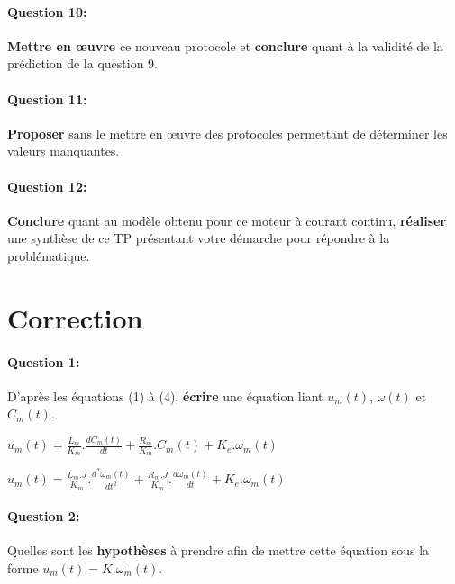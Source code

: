 
\paragraph{Question 10:} \textbf{Mettre en \oe uvre} ce nouveau protocole et \textbf{conclure} quant à la validité de la prédiction de la question 9.


\paragraph{Question 11:} \textbf{Proposer} sans le mettre en \oe uvre des protocoles permettant de déterminer les valeurs manquantes.


\paragraph{Question 12:} \textbf{Conclure} quant au modèle obtenu pour ce moteur à courant continu, \textbf{réaliser} une synthèse de ce TP présentant votre démarche pour répondre à la problématique.

\ifdef{\public}{}{}

\clearpage

\newpage

\pagestyle{correction}

\section{Correction}

\paragraph{Question 1:} D'après les équations (1) à (4), \textbf{écrire} une équation liant $u_m(t)$, $\omega(t)$ et $C_m(t)$.

$u_m(t)=\frac{L_m}{K_m}.\frac{dC_m(t)}{dt}+\frac{R_m}{K_m}.C_m(t)+K_e.\omega_m(t)$

$u_m(t)=\frac{L_m.J}{K_m}.\frac{d^2\omega_m(t)}{dt^2}+\frac{R_m.J}{K_m}.\frac{d\omega_m(t)}{dt}+K_e.\omega_m(t)$


\paragraph{Question 2:} Quelles sont les \textbf{hypothèses} à prendre afin de mettre cette équation sous la forme $u_m(t)=K.\omega_m(t)$.


